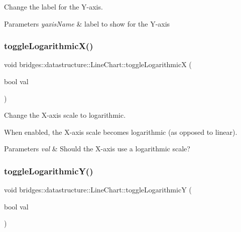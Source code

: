 Change the label for the Y-\/axis. 


\begin{DoxyParams}{Parameters}
{\em yaxis\+Name} & label to show for the Y-\/axis \\
\hline
\end{DoxyParams}
\mbox{\label{classbridges_1_1datastructure_1_1_line_chart_a4e2aa224d793793faa0c5a6edb729646}} 
\subsubsection{\texorpdfstring{toggle\+Logarithmic\+X()}{toggleLogarithmicX()}}
{\footnotesize\ttfamily void bridges\+::datastructure\+::\+Line\+Chart\+::toggle\+LogarithmicX (\begin{DoxyParamCaption}\item[{bool}]{val }\end{DoxyParamCaption})\hspace{0.3cm}{\ttfamily [inline]}}



Change the X-\/axis scale to logarithmic. 

When enabled, the X-\/axis scale becomes logarithmic (as opposed to linear).


\begin{DoxyParams}{Parameters}
{\em val} & Should the X-\/axis use a logarithmic scale? \\
\hline
\end{DoxyParams}
\mbox{\label{classbridges_1_1datastructure_1_1_line_chart_a30c72748323d3da25974b30e11e46f48}} 
\subsubsection{\texorpdfstring{toggle\+Logarithmic\+Y()}{toggleLogarithmicY()}}
{\footnotesize\ttfamily void bridges\+::datastructure\+::\+Line\+Chart\+::toggle\+LogarithmicY (\begin{DoxyParamCaption}\item[{bool}]{val }\end{DoxyParamCaption})\hspace{0.3cm}{\ttfamily [inline]}}



